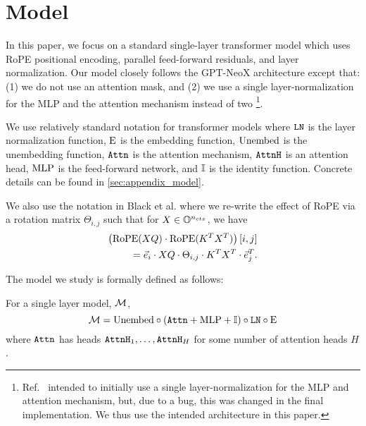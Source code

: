 \section{Model}
\label{sec:model}
In this paper, we focus on a standard single-layer transformer model which uses RoPE positional encoding, parallel feed-forward residuals, and layer normalization.
Our model closely follows the GPT-NeoX architecture \cite{black2022gptneox20bopensourceautoregressivelanguage} except that: (1) we do not use an attention mask, and (2) we use a single layer-normalization for the MLP and the attention mechanism instead of two
\footnote{Ref.~\cite{black2022gptneox20bopensourceautoregressivelanguage} intended to initially use a single layer-normalization for the MLP and attention mechanism, but, due to a bug, this was changed in the final implementation.
We thus use the intended architecture in this paper.}.

We use relatively standard notation for transformer models where $\texttt{LN}$ is the layer normalization function, $\text{E}$ is the embedding function, $\mathrm{Unembed}$ is the unembedding function, $\texttt{Attn}$ is the attention mechanism,  $\texttt{AttnH}$ is an attention head,
$\text{MLP}$ is the feed-forward network, and $\mathbb{I}$ is the identity function.
Concrete details can be found in \cref{sec:appendix_model}.

We also use the notation in Black et al. \cite{black2022gptneox20bopensourceautoregressivelanguage} where we re-write the effect of RoPE via a rotation matrix $\Theta_{i, j}$ such that for $X \in \mathbb{O}^{{n_{ctx}}}$, we have
\begin{align*}
	\left(\operatorname{RoPE}(X Q) \cdot \operatorname{RoPE}(K^T X^T)\right)[i, j]
	\\= \vec{e}_i \cdot X Q \cdot \Theta_{i, j} \cdot  K^T  X^T \cdot \vec{e}_j^T.
\end{align*}


The model we study is formally defined as follows:
\begin{definition}
	\label{def:one_layer_transformer}
        For a single layer model, $\mathcal{M}$,
	\[
		\mathcal{M} = \mathrm{Unembed} \circ (\texttt{Attn} + \text{MLP} + \mathbb{I}) \circ \texttt{LN} \circ \text{E}
	\]	
	where $\texttt{Attn}$ has heads $\texttt{AttnH}_1, \dots, \texttt{AttnH}_H$ for some number of attention heads $H$.
\end{definition}

